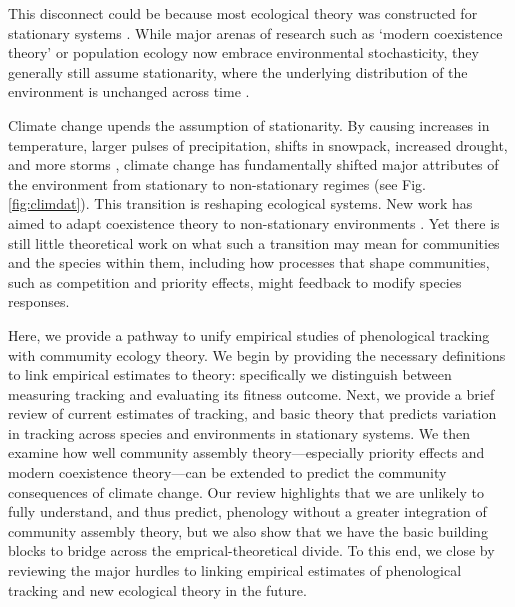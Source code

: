 \documentclass[11pt,letterpaper]{article}
\newcommand{\R}[1]{\label{}\linelabel{#1}}
\begin{document}
This disconnect could be because most ecological theory was constructed for stationary systems \citep[e.g.,][]{Chesson:1997dz}. While major arenas of research such as `modern coexistence theory' or population ecology now embrace environmental stochasticity, they generally still assume stationarity, where the underlying distribution of the environment is unchanged across time \citep[i.e., constant mean and variance,][]{barabas2018}.

Climate change upends the assumption of stationarity. By causing increases in temperature, larger pulses of precipitation, shifts in snowpack, increased drought, and more storms \citep{ipcc2013}, climate change has fundamentally shifted major attributes of the environment from stationary to non-stationary regimes (see Fig. \ref{fig:climdat}). This transition is reshaping ecological systems. New work has aimed to adapt coexistence theory to non-stationary environments \citep{chessonnonstat,volkerass}. Yet there is still little theoretical work on what such a transition may mean for communities and the species within them, including how processes that shape communities, \R{r2example}such as competition and priority effects, might feedback to modify species responses.

\R{r1whatpoint}Here, we provide a pathway to unify empirical studies of phenological tracking with commumity ecology theory. We begin by providing the necessary definitions to link empirical estimates to theory: specifically we distinguish between measuring tracking and evaluating its fitness outcome. Next, we provide a brief review of current estimates of tracking, and basic theory that predicts variation in tracking across species and environments in stationary systems. We then examine how well community assembly theory---especially priority effects and modern coexistence theory---can be extended to predict the community consequences of climate change. Our review highlights that we are unlikely to fully understand, and thus predict, phenology without a greater integration of community assembly theory, but we also show that we have the basic building blocks to bridge across the emprical-theoretical divide. To this end, we close by reviewing the major hurdles to linking empirical estimates of phenological tracking and new ecological theory in the future. %
\end{document}
